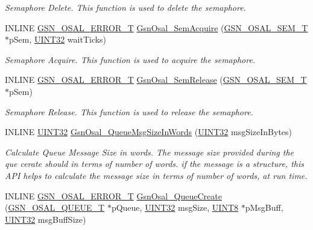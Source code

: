 \begin{DoxyCompactItemize}
\begin{DoxyCompactList}\small\item\em Semaphore Delete. This function is used to delete the semaphore. \end{DoxyCompactList}\item 
INLINE \hyperlink{a00659_ga36216a7aacd1d5024bc7b8bf39c3f46b}{GSN\_\-OSAL\_\-ERROR\_\-T} \hyperlink{a00628_ga35296c135e578c960847feb173d238da}{GsnOsal\_\-SemAcquire} (\hyperlink{a00628_gab4b3554407ce22b940e2fcd3faf5fd47}{GSN\_\-OSAL\_\-SEM\_\-T} $\ast$pSem, \hyperlink{a00660_gae1e6edbbc26d6fbc71a90190d0266018}{UINT32} waitTicks)
\begin{DoxyCompactList}\small\item\em Semaphore Acquire. This function is used to acquire the semaphore. \end{DoxyCompactList}\item 
INLINE \hyperlink{a00659_ga36216a7aacd1d5024bc7b8bf39c3f46b}{GSN\_\-OSAL\_\-ERROR\_\-T} \hyperlink{a00628_gac2be1dd2c117010d1c3b7b4c0fbc7323}{GsnOsal\_\-SemRelease} (\hyperlink{a00628_gab4b3554407ce22b940e2fcd3faf5fd47}{GSN\_\-OSAL\_\-SEM\_\-T} $\ast$pSem)
\begin{DoxyCompactList}\small\item\em Semaphore Release. This function is used to release the semaphore. \end{DoxyCompactList}\item 
INLINE \hyperlink{a00660_gae1e6edbbc26d6fbc71a90190d0266018}{UINT32} \hyperlink{a00628_gaa228381daedb3684e9d77e348d45ce15}{GsnOsal\_\-QueueMsgSizeInWords} (\hyperlink{a00660_gae1e6edbbc26d6fbc71a90190d0266018}{UINT32} msgSizeInBytes)
\begin{DoxyCompactList}\small\item\em Calculate Queue Message Size in words. The message size provided during the que cerate should in terms of number of words. if the message is a structure, this API helps to calculate the message size in terms of number of words, at run time. \end{DoxyCompactList}\item 
INLINE \hyperlink{a00659_ga36216a7aacd1d5024bc7b8bf39c3f46b}{GSN\_\-OSAL\_\-ERROR\_\-T} \hyperlink{a00628_gad7990e4a518c71f9d9a611b9ee379b9a}{GsnOsal\_\-QueueCreate} (\hyperlink{a00628_gaebe1c924d01bf6607bd65961bf134095}{GSN\_\-OSAL\_\-QUEUE\_\-T} $\ast$pQueue, \hyperlink{a00660_gae1e6edbbc26d6fbc71a90190d0266018}{UINT32} msgSize, \hyperlink{a00660_gab27e9918b538ce9d8ca692479b375b6a}{UINT8} $\ast$pMsgBuff, \hyperlink{a00660_gae1e6edbbc26d6fbc71a90190d0266018}{UINT32} msgBuffSize)

\end{DoxyCompactItemize}
